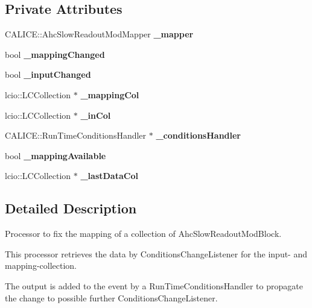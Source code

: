 \subsection*{Private Attributes}
\begin{DoxyCompactItemize}
\item 
C\-A\-L\-I\-C\-E\-::\-Ahc\-Slow\-Readout\-Mod\-Mapper {\bfseries \-\_\-mapper}\label{classAhcSROmappingProcessor_a7d712eeff246abd6edd2ecee49fb5777}

\item 
bool {\bfseries \-\_\-mapping\-Changed}\label{classAhcSROmappingProcessor_a8486c29c571d160450e616e6484ee243}

\item 
bool {\bfseries \-\_\-input\-Changed}\label{classAhcSROmappingProcessor_a285e84531df4faeaea3018b8a0a06b32}

\item 
lcio\-::\-L\-C\-Collection $\ast$ {\bfseries \-\_\-mapping\-Col}\label{classAhcSROmappingProcessor_a631ea134f436b99ee520fd705a8d392a}

\item 
lcio\-::\-L\-C\-Collection $\ast$ {\bfseries \-\_\-in\-Col}\label{classAhcSROmappingProcessor_ad60fb94a5944f4575563149537e02feb}

\item 
C\-A\-L\-I\-C\-E\-::\-Run\-Time\-Conditions\-Handler $\ast$ {\bfseries \-\_\-conditions\-Handler}\label{classAhcSROmappingProcessor_a13e326e568c0a3ba6b6b4fe6cfca5ab1}

\item 
bool {\bfseries \-\_\-mapping\-Available}\label{classAhcSROmappingProcessor_a33de2e4f529735385931b547914446b2}

\item 
lcio\-::\-L\-C\-Collection $\ast$ {\bfseries \-\_\-last\-Data\-Col}\label{classAhcSROmappingProcessor_a0df24f16b476f7d484caefc258294e5a}

\end{DoxyCompactItemize}


\subsection{Detailed Description}
Processor to fix the mapping of a collection of Ahc\-Slow\-Readout\-Mod\-Block. 

This processor retrieves the data by Conditions\-Change\-Listener for the input-\/ and mapping-\/collection.

The output is added to the event by a Run\-Time\-Conditions\-Handler to propagate the change to possible further Conditions\-Change\-Listener.

